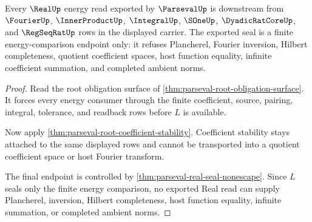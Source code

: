 \begin{theorem}
\label{thm:parseval-root-real-energy-nonescape}
Every $\RealUp$ energy read exported by $\ParsevalUp$ is downstream from $\FourierUp$, $\InnerProductUp$, $\IntegralUp$, $\SOneUp$, $\DyadicRatCoreUp$, and $\RegSeqRatUp$ rows in the displayed carrier. The exported seal is a finite energy-comparison endpoint only: it refuses Plancherel, Fourier inversion, Hilbert completeness, quotient coefficient spaces, host function equality, infinite coefficient summation, and completed ambient norms.
\end{theorem}
\begin{proof}
Read the root obligation surface of \autoref{thm:parseval-root-obligation-surface}. It forces every energy consumer through the finite coefficient, source, pairing, integral, tolerance, and readback rows before $L$ is available.

Now apply \autoref{thm:parseval-root-coefficient-stability}. Coefficient stability stays attached to the same displayed rows and cannot be transported into a quotient coefficient space or host Fourier transform.

The final endpoint is controlled by \autoref{thm:parseval-real-seal-nonescape}. Since $L$ seals only the finite energy comparison, no exported Real read can supply Plancherel, inversion, Hilbert completeness, host function equality, infinite summation, or completed ambient norms.
\end{proof}

